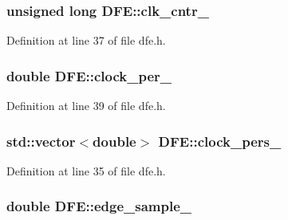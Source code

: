 \hypertarget{class_d_f_e_aea5a17495cf769abac1ef67221500a4c}{}
\subsubsection[{clk\+\_\+cntr\+\_\+}]{\setlength{\rightskip}{0pt plus 5cm}unsigned long D\+F\+E\+::clk\+\_\+cntr\+\_\+\hspace{0.3cm}{\ttfamily [protected]}}\label{class_d_f_e_aea5a17495cf769abac1ef67221500a4c}


Definition at line 37 of file dfe.\+h.

\hypertarget{class_d_f_e_a0d12f483bb415b2fcb48849287bed8f2}{}
\subsubsection[{clock\+\_\+per\+\_\+}]{\setlength{\rightskip}{0pt plus 5cm}double D\+F\+E\+::clock\+\_\+per\+\_\+\hspace{0.3cm}{\ttfamily [protected]}}\label{class_d_f_e_a0d12f483bb415b2fcb48849287bed8f2}


Definition at line 39 of file dfe.\+h.

\hypertarget{class_d_f_e_ad7db74a287762cdc91d572a1c5345e69}{}
\subsubsection[{clock\+\_\+pers\+\_\+}]{\setlength{\rightskip}{0pt plus 5cm}std\+::vector$<$double$>$ D\+F\+E\+::clock\+\_\+pers\+\_\+\hspace{0.3cm}{\ttfamily [protected]}}\label{class_d_f_e_ad7db74a287762cdc91d572a1c5345e69}


Definition at line 35 of file dfe.\+h.

\hypertarget{class_d_f_e_a67ee30ee356638ea41589e47adf74b02}{}
\subsubsection[{edge\+\_\+sample\+\_\+}]{\setlength{\rightskip}{0pt plus 5cm}double D\+F\+E\+::edge\+\_\+sample\+\_\+\hspace{0.3cm}{\ttfamily [protected]}}\label{class_d_f_e_a67ee30ee356638ea41589e47adf74b02}


